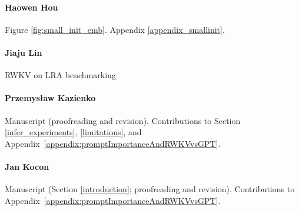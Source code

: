 \documentclass[11pt]{article}
\begin{document}
\paragraph{Haowen Hou} Figure \ref{fig:small_init_emb}. Appendix \ref{appendix_smallinit}.

\paragraph{Jiaju Lin} RWKV on LRA benchmarking

\paragraph{Przemys\l{}aw Kazienko} Manuscript (proofreading and revision). Contributions to Section \ref{infer_experiments}, \ref{limitations}, and Appendix~\ref{appendix:promptImportanceAndRWKVvsGPT}.

\paragraph{Jan Kocon} Manuscript (Section \ref{introduction}; proofreading and revision). Contributions to Appendix~\ref{appendix:promptImportanceAndRWKVvsGPT}.

\end{document}
